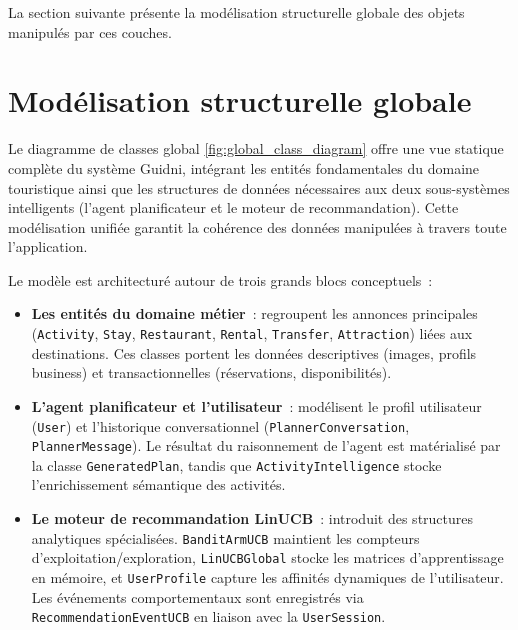 La section suivante présente la modélisation structurelle globale des objets manipulés par ces couches.


\section{Modélisation structurelle globale}

Le diagramme de classes global \ref{fig:global_class_diagram} offre une vue statique complète du système Guidni, intégrant
les entités fondamentales du domaine touristique ainsi que les structures de données
nécessaires aux deux sous-systèmes intelligents (l'agent planificateur et le moteur de 
recommandation). Cette modélisation unifiée garantit la cohérence des données manipulées 
à travers toute l'application.

Le modèle est architecturé autour de trois grands blocs conceptuels~:
\begin{itemize}[label=\textbullet]
    \item \textbf{Les entités du domaine métier}~: regroupent les annonces principales (\texttt{Activity}, \texttt{Stay}, \texttt{Restaurant}, \texttt{Rental}, \texttt{Transfer}, \texttt{Attraction}) liées aux destinations. Ces classes portent les données descriptives (images, profils business) et transactionnelles (réservations, disponibilités).
    \item \textbf{L'agent planificateur et l'utilisateur}~: modélisent le profil utilisateur (\texttt{User}) et l'historique conversationnel (\texttt{PlannerConversation}, \texttt{PlannerMessage}). Le résultat du raisonnement de l'agent est matérialisé par la classe \texttt{GeneratedPlan}, tandis que \texttt{ActivityIntelligence} stocke l'enrichissement sémantique des activités.
    \item \textbf{Le moteur de recommandation LinUCB}~: introduit des structures analytiques spécialisées. \texttt{BanditArmUCB} maintient les compteurs d'exploitation/exploration, \texttt{LinUCBGlobal} stocke les matrices d'apprentissage en mémoire, et \texttt{UserProfile} capture les affinités dynamiques de l'utilisateur. Les événements comportementaux sont enregistrés via \texttt{RecommendationEventUCB} en liaison avec la \texttt{UserSession}.
\end{itemize}

